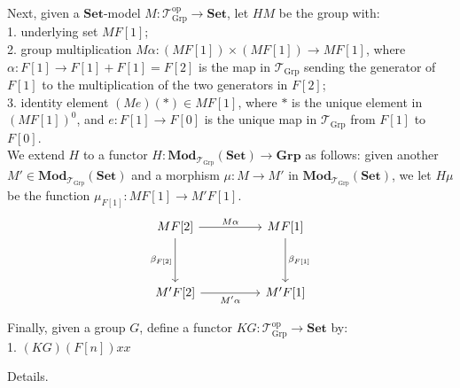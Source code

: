 \documentclass[
  letterpaper,
  DIV=11,
  numbers=noendperiod,
  oneside]{scrartcl}
\begin{document}
Next, given a \(\mathbf{Set}\)-model
\(M \colon \mathcal T_\mathrm{Grp}^\mathrm{op}\to \mathbf{Set}\), let
\(HM\) be the group with:\\
1. underlying set \(MF[1]\);\\
2. group multiplication
\(M\alpha \colon (MF[1]) \times (MF[1]) \to MF[1]\), where
\(\alpha \colon F[1] \to F[1] + F[1] = F[2]\) is the map in
\(\mathcal T_\mathrm{Grp}\) sending the generator of \(F[1]\) to the
multiplication of the two generators in \(F[2]\);\\
3. identity element \((Me)(*) \in MF[1]\), where \(*\) is the unique
element in \((MF[1])^0\), and \(e \colon F[1] \to F[0]\) is the unique
map in \(\mathcal T_\mathrm{Grp}\) from \(F[1]\) to \(F[0]\).\\
We extend \(H\) to a functor
\(H \colon \mathbf{Mod}_{\mathcal T_{\mathrm{Grp}}}(\mathbf{Set}) \to \mathbf{Grp}\)
as follows: given another
\(M' \in \mathbf{Mod}_{\mathcal T_\mathrm{Grp}}(\mathbf{Set})\) and a
morphism \(\mu \colon M \to M'\) in
\(\mathbf{Mod}_{\mathcal T_\mathrm{Grp}}(\mathbf{Set})\), we let
\(H\mu\) be the function \(\mu_{F[1]} \colon MF[1] \to M'F[1]\). \[
\begin{tikzcd}
    {MF[2]} && {MF[1]} \\
    \\
    {M'F[2]} && {M'F[1]}
    \arrow["{M\alpha}", from=1-1, to=1-3]
    \arrow["{\beta_{F[2]}}"', from=1-1, to=3-1]
    \arrow["{\beta_{F[1]}}", from=1-3, to=3-3]
    \arrow["{M'\alpha}"', from=3-1, to=3-3]
\end{tikzcd}
\]

Finally, given a group \(G\), define a functor
\(KG \colon \mathcal T_\mathrm{Grp}^\mathrm{op}\to \mathbf{Set}\) by:\\
1. \((KG)(F[n]) xx\)

Details.
\end{document}
